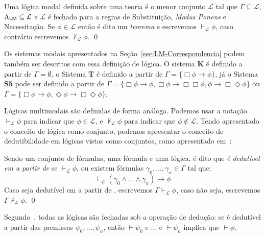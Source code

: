         \begin{definicao}
            \label{def:LogicaConjunto}
            Uma lógica modal definida sobre uma teoria \GAMMA é o menor conjunto \(\mathcal{L}\) tal que \(\Gamma \subseteq \mathcal{L}\), \(\Lambda_{\mathsf{LM}} \subseteq \mathcal{L}\)
            e \(\mathcal{L}\) é fechado para a regras de Substituição, \textit{Modus Ponens} e Necessitação. Se \(\phi \in \mathcal{L}\) então \PHI é dito um \textit{teorema}
            e escrevemos \(\vdash_{\mathcal{L}} \phi\), caso contrário escrevemos \(\nvdash_{\mathcal{L}} \phi\). \qed
        \end{definicao}

        Os sistemas modais apresentados na Seção~\ref{sec:LM-Correspondencia} podem também ser descritos com essa definição de lógica. O sistema \textbf{K}
        é definido a partir de \(\Gamma = \emptyset\), o Sistema \textbf{T} é definido a partir de \(\Gamma = \{\Box \phi \to \phi\}\), já o Sistema \textbf{S5}
        pode ser definido a partir de \(\Gamma = \{\Box \phi \rightarrow \phi, \Box \phi \to \Box \Box \phi, \phi \to \Box \Diamond \phi\}\) ou
        \(\Gamma = \{\Box \phi \rightarrow \phi, \Diamond \phi \rightarrow \Box \Diamond \phi\}\).

        Lógicas multimodais são definidas de forma análoga. Podemos usar a notação \(\vdash_{\mathcal{L}} \phi\) para indicar que \(\phi \in \mathcal{L}\),
        e \(\nvdash_{\mathcal{L}} \phi\) para indicar que \(\phi \notin \mathcal{L}\). Tendo apresentado o conceito de lógica como conjunto, podemos apresentar
        o conceito de dedutibilidade em lógicas vistas como conjuntos, como apresentado em~:

        \begin{definicao}[Dedutibilidade]
            Sendo \GAMMA um conjunto de fórmulas, \PHI uma fórmula e  uma lógica, é dito que \textit{\PHI é dedutível em  a partir de \GAMMA} se
            \(\vdash_{\mathcal{L}} \phi\), ou existem fórmulas \(\gamma_0, \dots, \gamma_n \in \Gamma\) tal que:
            \[
                \vdash_{\mathcal{L}} (\gamma_0 \land \dots \land \gamma_n) \to \phi
            \]
            Caso \PHI seja dedutível em  a partir de \GAMMA, escrevemos \(\Gamma \vdash_{\mathcal{L}} \phi\), caso não seja, escrevemos
            \(\Gamma \nvdash_{\mathcal{L}} \phi\). \qed
        \end{definicao}

        Segundo~, todas as lógicas são fechadas sob a operação de dedução: se \PHI é dedutível a partir das premissas
        \(\psi_0, \dots, \psi_n\), então \(\vdash \psi_0 \text{ e } \dots \text{ e } \vdash \psi_n\) implica que \(\vdash \phi\).

